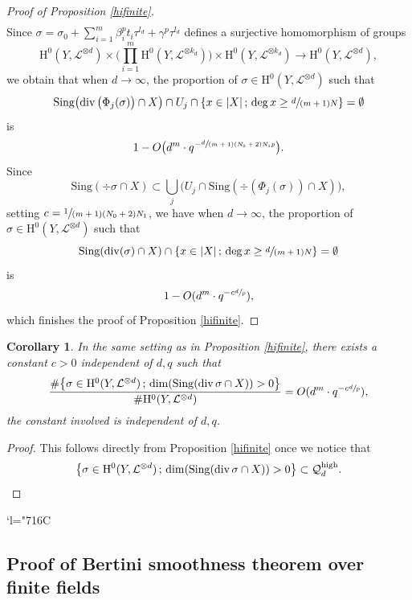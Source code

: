 \documentclass[11pt]{article}
\newcommand{\Subsection}{\subsection}
\numberwithin{equation}{section}
\newcommand{\Changelback}{\mathcode`l="716C}
\newcommand{\sep}{\,;\,}
\theoremstyle{plain}
\newtheorem{cor}[thm]{Corollary}
\theoremstyle{definition}
\newcommand{\ho}{\mathrm{H}}
\begin{document}
\begin{proof}[Proof of Proposition \ref{hifinite}]
\begin{align*}
\end{align*}
Since $\sigma=\sigma_0+\sum_{i=1}^{m} \beta_i^pt_i\tau^{l_d}+\gamma^p\tau^{l_d}$ defines a surjective homomorphism of groups
\[
\ho^0(Y,\mathcal{L}^{\otimes d})\times \biggl(\prod_{i=1}^m \ho^0(Y,\mathcal{L}^{\otimes k_d}) \biggr) \times \ho^0(Y, \mathcal{L}^{\otimes k_d}) \to \ho^0(Y, \mathcal{L}^{\otimes d}),
\]
we obtain that when $d\to \infty$, the proportion of $\sigma\in \ho^0(Y, \mathcal{L}^{\otimes d})$ such that
\[
\mathrm{Sing}\bigl(\div \big(\Phi_j(\sigma)\big)\cap X\bigr) \cap U_j\cap \left\{ x\in |X|\sep \deg x\geq\sfrac{d}{(m+1)N} \right\}=\emptyset
\]
is
\[
1-O\bigl(d^{m}\cdot q^{-\sfrac{d}{(m+1)(N_0+2)N_1 p}}\bigr).
\]
Since
\[
\mathrm{Sing}(\div \sigma\cap X)\subset \bigcup_{j} \bigl(U_j\cap \mathrm{Sing}(\div (\Phi_j(\sigma))\cap X)\bigr),
\]
setting $c=\sfrac{1}{(m+1)(N_0+2)N_1}$, we have when $d\to \infty$, the proportion of $\sigma\in \ho^0(Y, \mathcal{L}^{\otimes d})$ such that
\[
\mathrm{Sing}(\div (\sigma)\cap X) \cap \left\{ x\in |X|\sep \deg x\geq\sfrac{d}{(m+1)N} \right\}=\emptyset
\]
is
\[
1-O(d^{m}\cdot q^{-c\sfrac{d}{p}}),
\]
which finishes the proof of Proposition \ref{hifinite}.
\end{proof}

\begin{cor}\label{hidim}
In the same setting as in Proposition \ref{hifinite}, there exists a constant $c>0$ independent of $d,q$ such that
\[
\frac{ \#\bigl\{ \sigma \in \ho^0(Y, \mathcal{L}^{\otimes d})\sep \dim(\mathrm{Sing}(\div \sigma\cap X))>0 \bigr\}}{\# \ho^0(Y, \mathcal{L}^{\otimes d})}=O(d^{m}\cdot q^{-c\sfrac{d}{p}}),
\]
the constant involved is independent of $d,q$.
\end{cor}
\begin{proof}
This follows directly from Proposition \ref{hifinite} once we notice that
\[
\left\{ \sigma \in \ho^0(Y, \mathcal{L}^{\otimes d})\sep \dim(\mathrm{Sing}(\div \sigma\cap X))>0 \right\}\subset \mathcal{Q}_{d}^{\mathrm{high}}.\qedhere
\]
\end{proof}
\Changelback

\Subsection{Proof of Bertini smoothness theorem over finite fields}
\end{document}
